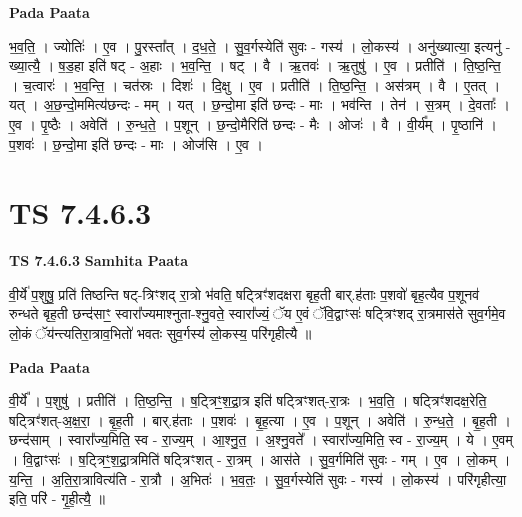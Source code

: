\documentclass[17pt]{extarticle}
\begin{document}
\textbf{Pada Paata} \newline

भ॒व॒ति॒ । ज्योतिः॑ । ए॒व । पु॒रस्ता᳚त् । द॒ध॒ते॒ । सु॒व॒र्गस्येति॑ सुवः - गस्य॑ । लो॒कस्य॑ । अनु॑ख्यात्या॒ इत्यनु॑ - ख्या॒त्यै॒ । ष॒ड॒हा इति॑ षट् - अ॒हाः । भ॒व॒न्ति॒ । षट् । वै । ऋ॒तवः॑ । ऋ॒तुषु॑ । ए॒व । प्रतीति॑ । ति॒ष्ठ॒न्ति॒ । च॒त्वारः॑ । भ॒व॒न्ति॒ । चत॑स्रः । दिशः॑ । दि॒क्षु । ए॒व । प्रतीति॑ । ति॒ष्ठ॒न्ति॒ । अस॑त्रम् । वै । ए॒तत् । यत् । अ॒छ॒न्दो॒ममित्य॑छन्दः - मम् । यत् । छ॒न्दो॒मा इति॑ छन्दः - माः । भव॑न्ति । तेन॑ । स॒त्रम् । दे॒वताः᳚ । ए॒व । पृ॒ष्ठैः । अवेति॑ । रु॒न्ध॒ते॒ । प॒शून् । छ॒न्दो॒मैरिति॑ छन्दः - मैः । ओजः॑ । वै । वी॒र्य᳚म् । पृ॒ष्ठानि॑ । प॒शवः॑ । छ॒न्दो॒मा इति॑ छन्दः - माः । ओज॑सि । ए॒व ।  \newline




\section*{ TS 7.4.6.3 }

\textbf{TS 7.4.6.3 } \newline
\textbf{Samhita Paata} \newline

वी॒र्ये॑ प॒शुषु॒ प्रति॑ तिष्ठन्ति षट्-त्रिꣳशद् रा॒त्रो भ॑वति॒ षट्त्रिꣳ॑शदक्षरा बृह॒ती बार्.ह॑ताः प॒शवो॑ बृह॒त्यैव प॒शूनव॑ रुन्धते बृह॒ती छन्द॑साꣳ॒॒ स्वारा᳚ज्यमाश्नुता-श्नु॒वते॒ स्वारा᳚ज्यं॒ ॅय ए॒वं ॅवि॒द्वाꣳसः॑ षट्त्रिꣳशद् रा॒त्रमास॑ते सुव॒र्गमे॒व लो॒कं ॅय॑न्त्यतिरा॒त्राव॒भितो॑ भवतः सुव॒र्गस्य॑ लो॒कस्य॒ परि॑गृहीत्यै ॥ \newline

\textbf{Pada Paata} \newline

वी॒र्ये᳚ । प॒शुषु॑ । प्रतीति॑ । ति॒ष्ठ॒न्ति॒ । ष॒ट्त्रिꣳ॒॒श॒द्रा॒त्र इति॑ षट्त्रिꣳशत्-रा॒त्रः । भ॒व॒ति॒ । षट्त्रिꣳ॑शदक्ष॒रेति॒ षट्त्रिꣳ॑शत्-अ॒क्ष॒रा॒ । बृ॒ह॒ती । बार्.ह॑ताः । प॒शवः॑ । बृ॒ह॒त्या । ए॒व । प॒शून् । अवेति॑ । रु॒न्ध॒ते॒ । बृ॒ह॒ती । छन्द॑साम् । स्वारा᳚ज्य॒मिति॒ स्व - रा॒ज्य॒म् । आ॒श्नु॒त॒ । अ॒श्नु॒वते᳚ । स्वारा᳚ज्य॒मिति॒ स्व - रा॒ज्य॒म् । ये । ए॒वम् । वि॒द्वाꣳसः॑ । ष॒ट्त्रिꣳ॒॒श॒द्रा॒त्रमिति॑ षट्त्रिꣳशत् - रा॒त्रम् । आस॑ते । सु॒व॒र्गमिति॑ सुवः - गम् । ए॒व । लो॒कम् । य॒न्ति॒ । अ॒ति॒रा॒त्रावित्य॑ति - रा॒त्रौ । अ॒भितः॑ । भ॒व॒तः॒ । सु॒व॒र्गस्येति॑ सुवः - गस्य॑ । लो॒कस्य॑ । परि॑गृहीत्या॒ इति॒ परि॑ - गृ॒ही॒त्यै॒ ॥  \newline
\end{document}
